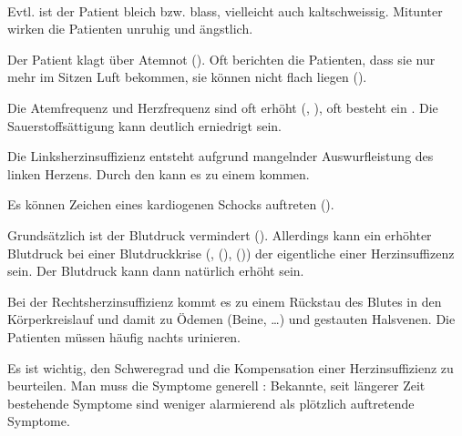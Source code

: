 {\TxABCDE}
{~
\label{topic:linksherzinsuffizienz}%
%
%
%
\label{topic:rechtsherzinsuffizienz}%
%
%
%
\begin{ABCDEText}
  \item[\ABCDE{3}] Evtl. ist der Patient bleich bzw.
  blass, vielleicht auch kaltschweissig. Mitunter wirken die
  Patienten unruhig und ängstlich.
  \item[\ABCDE{4}] Der Patient klagt über Atemnot (). Oft berichten
  die Patienten, dass sie nur mehr im Sitzen Luft bekommen,
  sie können nicht flach liegen
  ().
  \item[\ABCDE{B}] Die Atemfrequenz und Herzfrequenz sind
  oft erhöht (,
  ), oft besteht ein . Die
  Sauerstoffsättigung kann deutlich erniedrigt sein.
  
  Die Linksherzinsuffizienz entsteht aufgrund mangelnder
  Auswurfleistung des linken Herzens. Durch den  kann es zu einem
   kommen. 
  \item[\ABCDE{C}] Es können Zeichen eines kardiogenen
  Schocks auftreten
  ().
  \item[\ABCDE{D}] Grundsätzlich ist der Blutdruck vermindert ().
  Allerdings kann ein erhöhter Blutdruck bei einer
  Blutdruckkrise (, 
  (),  ()) der
  eigentliche  einer Herzinsuffizenz sein. Der
  Blutdruck
  kann dann natürlich erhöht sein.
  \item[\ABCDE{E}] %
  \item[\ABCDE{\ldots}]
  Bei der Rechtsherzinsuffizienz kommt
  es zu einem Rückstau des Blutes in den Körperkreislauf und
  damit zu Ödemen (Beine, \ldots) und gestauten Halsvenen.
  Die Patienten müssen häufig nachts urinieren. 
  \item[\ABCDE{=}] Es ist wichtig, den Schweregrad und die Kompensation einer
  Herzinsuffizienz zu beurteilen. Man muss die Symptome generell : Bekannte, seit längerer Zeit
  bestehende Symptome sind weniger alarmierend als plötzlich
  auftretende Symptome. 
  

\end{ABCDEText}}
